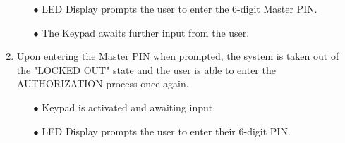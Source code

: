 \documentclass{article}
\begin{document}
\begin{enumerate}
\begin{enumerate}
        \item[$\bullet$] LED Display prompts the user to enter the 6-digit Master PIN.
        \item[$\bullet$] The Keypad awaits further input from the user.
    \end{enumerate}
    \item Upon entering the Master PIN when prompted, the system is taken out of the "LOCKED OUT" state and the user is able to enter the AUTHORIZATION process once again.
    \begin{enumerate}
        \item[$\bullet$] Keypad is activated and awaiting input.
        \item[$\bullet$] LED Display prompts the user to enter their 6-digit PIN.
    \end{enumerate}    
\end{enumerate}

\newpage

\printbibliography

{\parindent0pt}
\end{document}

